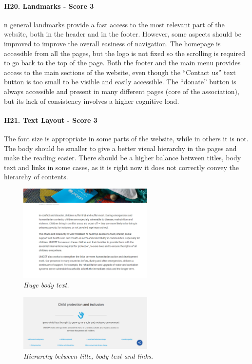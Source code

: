 \paragraph*{H20. Landmarks  - Score 3}
n general landmarks provide a fast access to the most relevant part of the website, both in the header and in the footer. However, some aspects should be improved to improve the overall easiness of navigation.
The homepage is accessible from all the pages, but the logo is not fixed so the scrolling is required to go back to the top of the page. Both the footer and the main menu provides access to the main sections of the website, even though the “Contact us” text button is too small to be visible and easily accessible. The “donate” button is always accessible and present in many different pages (core of the association), but its lack of consistency involves a higher cognitive load.

\paragraph*{H21. Text Layout  - Score 3}
The font size is appropriate in some parts of the website, while in others it is not. The body should be smaller to give a better visual hierarchy in the pages and make the reading easier. There should be a higher balance between titles, body text and links in some cases, as it is right now it does not correctly convey the hierarchy of contents.

\begin{figure}[h]
	\centering
	\begin{center}
		\includegraphics[width=0.6\textwidth]{Picture21.png}
	\end{center}
	\captionsetup{font=small}
	\caption{\textit{Huge body text.}}
	\label{fig:label21}
\end{figure}

\begin{figure}[h]
	\centering
	\begin{center}
		\includegraphics[width=0.6\textwidth]{Picture22.png}
	\end{center}
	\captionsetup{font=small}
	\caption{\textit{Hierarchy between title, body text and links.}}
	\label{fig:label21}
\end{figure}


